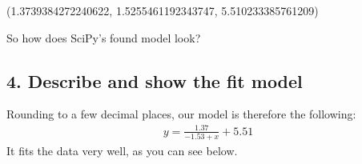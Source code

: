 \documentclass[letterpaper,10pt,english]{jupyterBook}
\begin{document}
\begin{sphinxVerbatim}[commandchars=\\\{\}]
(1.3739384272240622, \PYGZhy{}1.5255461192343747, 5.510233385761209)
\end{sphinxVerbatim}

\sphinxAtStartPar
So how does SciPy’s found model look?


\subsection{4. Describe and show the fit model}
\label{\detokenize{chapter-9-math-and-stats:describe-and-show-the-fit-model}}
\sphinxAtStartPar
Rounding to a few decimal places, our model is therefore the following:
\begin{equation*}
\begin{split} y=\frac{1.37}{-1.53+x}+5.51 \end{split}
\end{equation*}
\sphinxAtStartPar
It fits the data very well, as you can see below.

\begin{sphinxVerbatim}[commandchars=\\\{\}]
         
   
     
\end{sphinxVerbatim}

\noindent{}
\end{document}
